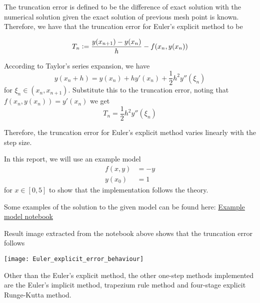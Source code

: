 The truncation error is defined to be the difference of exact solution with the numerical solution given the exact solution of previous mesh point is known. Therefore, we have that the truncation error for Euler's explicit method to be

\begin{equation}
\label{eqn:trun_err_def}
    T_n \vcentcolon= \frac{y(x_{n+1}) - y(x_{n})}{h} - f(x_n, y(x_n))
\end{equation}

According to Taylor's series expansion, we have 
\begin{equation}
    y(x_n + h) = y(x_n) + hy'(x_n) + \frac{1}{2}h^2y''(\xi_n)
\end{equation}
for $\xi_n \in (x_n, x_{n+1})$. Substitute this to the truncation error, noting that $f(x_n, y(x_n)) = y'(x_n)$ we get
\begin{equation}
    T_n = \frac{1}{2}h^2y''(\xi_n)
\end{equation}

Therefore, the truncation error for Euler's explicit method varies linearly with the step size.

In this report, we will use an example model 
\begin{align}
\label{eqn:example_model}
    f(x,y) &= -y \\
    y(x_0) &= 1
\end{align}
for $x \in [0, 5]$ to show that the implementation follows the theory.

Some examples of the solution to the given model can be found here: \href{https://nbviewer.jupyter.org/github/FarmHJ/numerical-solver/blob/main/examples/solver_convergence.ipynb}{Example model notebook}

Result image extracted from the notebook above shows that the truncation error follows 

\texttt{[image: Euler\_explicit\_error\_behaviour]}

Other than the Euler's explicit method, the other one-step methods implemented are the Euler's implicit method, trapezium rule method and four-stage explicit Runge-Kutta method.


